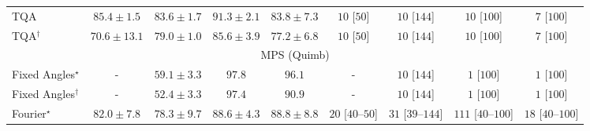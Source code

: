 \begin{tabular}{l|cccc|cccc|}
TQA & {\cellcolor[HTML]{894CA2}} \color[HTML]{F1F1F1} $85.4\pm 1.5$ & {\cellcolor[HTML]{8A59A8}} \color[HTML]{F1F1F1} $83.6\pm 1.7$ & {\cellcolor[HTML]{831A83}} \color[HTML]{F1F1F1} $91.3\pm 2.1$ & {\cellcolor[HTML]{8A58A8}} \color[HTML]{F1F1F1} $83.8\pm 7.3$ & {\cellcolor[HTML]{FFF6F2}} \color[HTML]{000000} $10$ [$50$] & {\cellcolor[HTML]{FFF6F2}} \color[HTML]{000000} $10$ [$144$] & {\cellcolor[HTML]{FFF6F2}} \color[HTML]{000000} $10$ [$100$] & {\cellcolor[HTML]{FFF6F2}} \color[HTML]{000000} $7$ [$100$] \\
TQA$^\dagger$ & {\cellcolor[HTML]{9BB6D7}} \color[HTML]{000000} $70.6\pm 13.1$ & {\cellcolor[HTML]{8C7AB8}} \color[HTML]{F1F1F1} $79.0\pm 1.0$ & {\cellcolor[HTML]{894BA2}} \color[HTML]{F1F1F1} $85.6\pm 3.9$ & {\cellcolor[HTML]{8C88BF}} \color[HTML]{F1F1F1} $77.2\pm 6.8$ & {\cellcolor[HTML]{FFF6F2}} \color[HTML]{000000} $10$ [$50$] & {\cellcolor[HTML]{FFF6F2}} \color[HTML]{000000} $10$ [$144$] & {\cellcolor[HTML]{FFF6F2}} \color[HTML]{000000} $10$ [$100$] & {\cellcolor[HTML]{FFF6F2}} \color[HTML]{000000} $7$ [$100$] \\
\cline{1-9}
\multicolumn{9}{c}{\rule{0pt}{8pt}MPS (Quimb)} \\
\midrule
Fixed Angles$^\star$ & {\cellcolor[HTML]{000000}} \color[HTML]{F1F1F1} {\cellcolor{white}} \color{black} - & {\cellcolor[HTML]{FFF4B5}} \color[HTML]{000000} $59.1\pm 3.3$ & {\cellcolor[HTML]{6B2606}} \color[HTML]{F1F1F1} $97.8$ & {\cellcolor[HTML]{792B05}} \color[HTML]{F1F1F1} $96.1$ & {\cellcolor[HTML]{000000}} \color[HTML]{F1F1F1} {\cellcolor{white}} \color{black} - & {\cellcolor[HTML]{FFF6F2}} \color[HTML]{000000} $10$ [$144$] & {\cellcolor[HTML]{FFF7F3}} \color[HTML]{000000} $1$ [$100$] & {\cellcolor[HTML]{FFF7F3}} \color[HTML]{000000} $1$ [$100$] \\
Fixed Angles$^\dagger$ & {\cellcolor[HTML]{000000}} \color[HTML]{F1F1F1} {\cellcolor{white}} \color{black} - & {\cellcolor[HTML]{FFFFE5}} \color[HTML]{000000} $52.4\pm 3.3$ & {\cellcolor[HTML]{6E2706}} \color[HTML]{F1F1F1} $97.4$ & {\cellcolor[HTML]{A83B03}} \color[HTML]{F1F1F1} $90.9$ & {\cellcolor[HTML]{000000}} \color[HTML]{F1F1F1} {\cellcolor{white}} \color{black} - & {\cellcolor[HTML]{FFF6F2}} \color[HTML]{000000} $10$ [$144$] & {\cellcolor[HTML]{FFF7F3}} \color[HTML]{000000} $1$ [$100$] & {\cellcolor[HTML]{FFF7F3}} \color[HTML]{000000} $1$ [$100$] \\
Fourier$^\star$ & {\cellcolor[HTML]{E76B11}} \color[HTML]{F1F1F1} $82.0\pm 7.8$ & {\cellcolor[HTML]{F5841E}} \color[HTML]{F1F1F1} $78.3\pm 9.7$ & {\cellcolor[HTML]{BC4503}} \color[HTML]{F1F1F1} $88.6\pm 4.3$ & {\cellcolor[HTML]{BB4403}} \color[HTML]{F1F1F1} $88.8\pm 8.8$ & {\cellcolor[HTML]{FFF3EF}} \color[HTML]{000000} $20$ [$40$--$50$] & {\cellcolor[HTML]{FEF1ED}} \color[HTML]{000000} $31$ [$39$--$144$] & {\cellcolor[HTML]{FDDDD9}} \color[HTML]{000000} $111$ [$40$--$100$] & {\cellcolor[HTML]{FFF3F0}} \color[HTML]{000000} $18$ [$40$--$100$] \\

\end{tabular}
